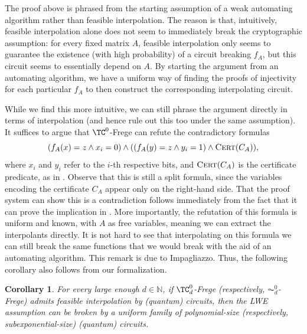 \documentclass[11pt]{article}
\theoremstyle{definition}
\theoremstyle{plain}
\newtheorem{corollary}[definition]{Corollary}
\theoremstyle{remark}
\newcommand{\bN}{\mathbb{N}}
\begin{document}
    The proof above is phrased from the starting assumption of a weak automating algorithm rather than feasible interpolation. The reason is that, intuitively, feasible interpolation alone does not seem to immediately break the cryptographic assumption: for every fixed matrix $A$, feasible interpolation only seems to guarantee the existence (with high probability) of a circuit breaking $f_A$, but this circuit seems to essentially depend on $A$. By starting the argument from an automating algorithm, we have a uniform way of finding the proofs of injectivity for each particular $f_A$ to then construct the corresponding interpolating circuit.

    While we find this more intuitive, we can still phrase the argument directly in terms of interpolation (and hence rule out this too under the same assumption). It suffices to argue that $\TC^0$-Frege can refute the contradictory formulas
    \[  (f_A(x) = z \land x_i = 0) \land ((f_A(y) = z \land y_i = 1 ) \land \textsc{Cert}(C_A)), \]
    where $x_i$ and $y_i$ refer to the $i$-th respective bits, and $\textsc{Cert}(C_A)$ is the certificate predicate, as in . Observe that this is still a split formula, since the variables encoding the certificate $C_A$ appear only on the right-hand side. That the proof system can show this is a contradiction follows immediately from the fact that it can prove the implication in . More importantly, the refutation of this formula is uniform and known, with $A$ as free variables, meaning we can extract the interpolants directly. It is not hard to see that interpolating on this formula we can still break the same functions that we would break with the aid of an automating algorithm. This remark is due to Impagliazzo. Thus, the following corollary also follows from our formalization.

\begin{corollary}
    For every large enough $d \in \bN$, if $\TC_d^0$-Frege (respectively, $\AC^0_d$-Frege) admits feasible interpolation by (quantum) circuits, then the LWE assumption can be broken by a uniform family of polynomial-size (respectively, subexponential-size) (quantum) circuits.
\end{corollary}
\end{document}
